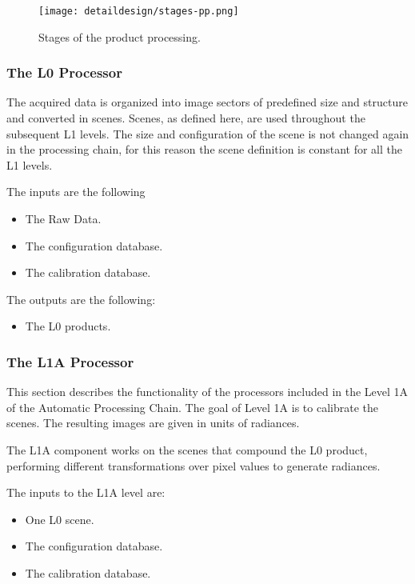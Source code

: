 \begin{figure}[!h]
\begin{center}
\texttt{[image: detaildesign/stages-pp.png]}
\caption{Stages of the product processing.}
\label{fig:cloud-states-pp}
\end{center}
\end{figure}

\subsubsection{The L0 Processor}

The acquired data is organized into image sectors of predefined size and structure and converted in scenes. Scenes, as defined here, are used throughout the subsequent L1 levels. The size and configuration of the scene is not changed again in the processing chain, for this reason the scene definition is constant for all the L1 levels.

The inputs are the following
\begin{itemize}
\item The Raw Data.
\item The configuration database.
\item The calibration database.
\end{itemize}
The outputs are the following:
\begin{itemize}
\item The L0 products.
\end{itemize}

\subsubsection{The L1A Processor}

This section describes the functionality of the processors included in the Level 1A of the Automatic Processing Chain. The goal of Level 1A is to calibrate the scenes. The resulting images are given in units of radiances. 

The L1A component works on the scenes that compound the L0 product, performing different transformations over pixel values to generate radiances.

The inputs to the L1A level are:
\begin{itemize}
\item One L0 scene.
\item The configuration database.
\item The calibration database.
\end{itemize}

